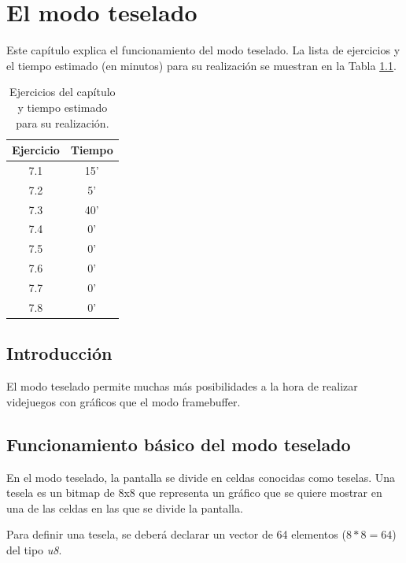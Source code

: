 \chapter{El modo teselado}

Este capítulo explica el funcionamiento del modo teselado. La lista de ejercicios y el tiempo estimado (en minutos) para su realización se muestran en la Tabla \ref{c7_tab:ejercios}.

\begin{table}[t]
	\centering
	\caption{Ejercicios del capítulo y tiempo estimado para su realización.}
	\begin{tabular}{|c|c|}
		\hline 
		Ejercicio & Tiempo \\ 
		\hline 
		7.1 & 15' \\ 
		7.2 & 5' \\ 
		7.3 & 40' \\ 
		7.4 & 0' \\ 
		7.5 & 0' \\ 
		7.6 & 0' \\ 
		7.7 & 0' \\ 
		7.8 & 0' \\ 
		\hline 
	\end{tabular} 
	\label{c7_tab:ejercios}
\end{table}


\section{Introducción}
El modo teselado permite muchas más posibilidades a la hora de realizar videjuegos con gráficos que el modo framebuffer. 

\section{Funcionamiento básico del modo teselado}
En el modo teselado, la pantalla se divide en celdas conocidas como teselas. Una tesela es un bitmap de 8x8 que representa un gráfico que se quiere mostrar en una de las celdas en las que se divide la pantalla. 

Para definir una tesela, se deberá declarar un vector de 64 elementos ($8*8=64$) del tipo \textit{u8}. 

